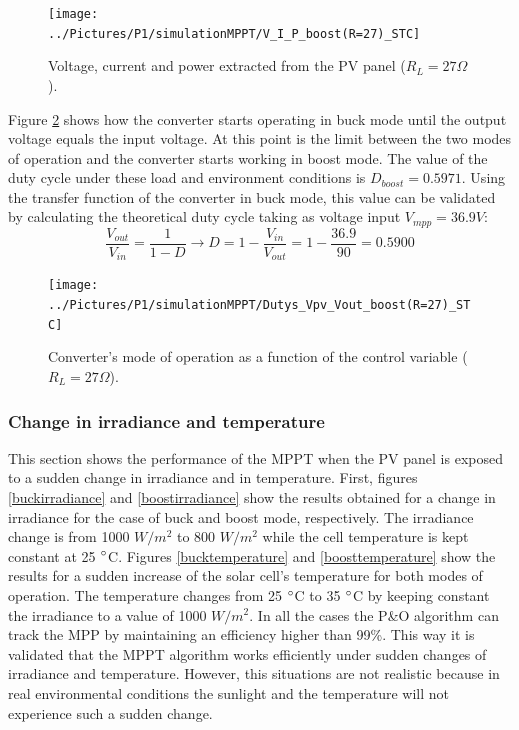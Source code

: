\begin{figure}[H]
	\begin{center}
		\texttt{[image: ../Pictures/P1/simulationMPPT/V\_I\_P\_boost(R=27)\_STC]}
		\caption{Voltage, current and power extracted from the PV panel ($R_{L}=27\Omega$).}
		\label{boostSTC} 
	\end{center}	
\end{figure}

Figure \ref{boostSTC_duty} shows how the converter starts operating in buck mode until the output voltage equals the input voltage. At this point is the limit between the two modes of operation and the converter starts working in boost mode. The value of the duty cycle under these load and environment conditions is $D_{boost}= 0.5971$. Using the transfer function of the converter in  buck mode, this value can be validated by calculating the theoretical duty cycle taking as voltage input $V_{mpp}=36.9 V$: 
\begin{equation}
\frac{V_{out}}{V_{in}}= \frac{1}{1-D} \rightarrow D = 1 - \frac{V_{in}}{V_{out}} = 1 - \frac{36.9}{90} = 0.5900
\end{equation}
 
\begin{figure}[H]
	\begin{center}
		\texttt{[image: ../Pictures/P1/simulationMPPT/Dutys\_Vpv\_Vout\_boost(R=27)\_STC]}
		\caption{Converter's mode of operation as a function of the control variable ($R_{L}=27\Omega$).}
		\label{boostSTC_duty} 
	\end{center}	
\end{figure}

\subsubsection*{Change in irradiance and temperature}

This section shows the performance of the MPPT when the PV panel is exposed to a sudden change in irradiance and in temperature. First, figures \ref{buckirradiance} and \ref{boostirradiance} show the results obtained for a change in irradiance for the case of buck and boost mode, respectively. The irradiance change is from 1000 $W/ m^2$ to 800 $W/ m^2$ while the cell temperature is kept constant at 25 $\dec$C. 
Figures \ref{bucktemperature} and \ref{boosttemperature}  show the results for a sudden increase of the solar cell's temperature for both modes of operation. The temperature changes from 25 $\dec$C to 35 $\dec$C by keeping constant the irradiance to a value of 1000 $W/ m^2$. 
In all the cases the P\&O algorithm can track the MPP by maintaining an efficiency higher than 99\%. This way it is validated that the MPPT algorithm works efficiently under sudden changes of irradiance and temperature. However, this situations are not realistic because in real environmental conditions the sunlight and the temperature will not experience such a sudden change. 

